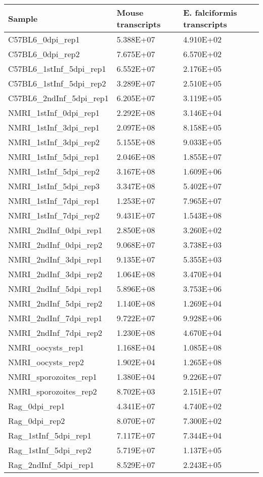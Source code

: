 \begin{table}[ht]
\centering
\begin{tabular}{lll}
  \hline
Sample & Mouse transcripts & E. falciformis transcripts \\ 
  \hline
C57BL6\_0dpi\_rep1 & 5.388E+07 & 4.910E+02 \\ 
  C57BL6\_0dpi\_rep2 & 7.675E+07 & 6.570E+02 \\ 
  C57BL6\_1stInf\_5dpi\_rep1 & 6.552E+07 & 2.176E+05 \\ 
  C57BL6\_1stInf\_5dpi\_rep2 & 3.289E+07 & 2.510E+05 \\ 
  C57BL6\_2ndInf\_5dpi\_rep1 & 6.205E+07 & 3.119E+05 \\ 
  NMRI\_1stInf\_0dpi\_rep1 & 2.292E+08 & 3.146E+04 \\ 
  NMRI\_1stInf\_3dpi\_rep1 & 2.097E+08 & 8.158E+05 \\ 
  NMRI\_1stInf\_3dpi\_rep2 & 5.155E+08 & 9.033E+05 \\ 
  NMRI\_1stInf\_5dpi\_rep1 & 2.046E+08 & 1.855E+07 \\ 
  NMRI\_1stInf\_5dpi\_rep2 & 3.167E+08 & 1.609E+06 \\ 
  NMRI\_1stInf\_5dpi\_rep3 & 3.347E+08 & 5.402E+07 \\ 
  NMRI\_1stInf\_7dpi\_rep1 & 1.253E+07 & 7.965E+07 \\ 
  NMRI\_1stInf\_7dpi\_rep2 & 9.431E+07 & 1.543E+08 \\ 
  NMRI\_2ndInf\_0dpi\_rep1 & 2.850E+08 & 3.260E+02 \\ 
  NMRI\_2ndInf\_0dpi\_rep2 & 9.068E+07 & 3.738E+03 \\ 
  NMRI\_2ndInf\_3dpi\_rep1 & 9.135E+07 & 5.355E+03 \\ 
  NMRI\_2ndInf\_3dpi\_rep2 & 1.064E+08 & 3.470E+04 \\ 
  NMRI\_2ndInf\_5dpi\_rep1 & 5.896E+08 & 3.753E+06 \\ 
  NMRI\_2ndInf\_5dpi\_rep2 & 1.140E+08 & 1.269E+04 \\ 
  NMRI\_2ndInf\_7dpi\_rep1 & 9.722E+07 & 9.928E+06 \\ 
  NMRI\_2ndInf\_7dpi\_rep2 & 1.230E+08 & 4.670E+04 \\ 
  NMRI\_oocysts\_rep1 & 1.168E+04 & 1.085E+08 \\ 
  NMRI\_oocysts\_rep2 & 1.902E+04 & 1.265E+08 \\ 
  NMRI\_sporozoites\_rep1 & 1.380E+04 & 9.226E+07 \\ 
  NMRI\_sporozoites\_rep2 & 8.702E+03 & 2.151E+07 \\ 
  Rag\_0dpi\_rep1 & 4.341E+07 & 4.740E+02 \\ 
  Rag\_0dpi\_rep2 & 8.070E+07 & 7.300E+02 \\ 
  Rag\_1stInf\_5dpi\_rep1 & 7.117E+07 & 7.344E+04 \\ 
  Rag\_1stInf\_5dpi\_rep2 & 5.719E+07 & 1.137E+05 \\ 
  Rag\_2ndInf\_5dpi\_rep1 & 8.529E+07 & 2.243E+05 \\ 
   \hline
\end{tabular}
\end{table}
